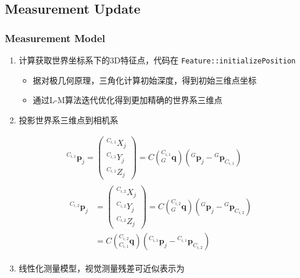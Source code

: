 \documentclass[12pt,a4paper]{article}
\begin{document}
\subsection{Measurement Update}

\subsubsection{Measurement Model}

\begin{enumerate}

\item 计算获取世界坐标系下的3D特征点，代码在 \verb|Feature::initializePosition|

\begin{itemize}
\item 据对极几何原理，三角化计算初始深度，得到初始三维点坐标
\item 通过L-M算法迭代优化得到更加精确的世界系三维点
\end{itemize}

\item 投影世界系三维点到相机系

\begin{equation*}
\begin{gathered}
{}^{C_{i, 1}}\mathbf{p}_j = 
\begin{pmatrix}
{}^{C_{i, 1}}X_j \\ {}^{C_{i, 1}}Y_j \\ {}^{C_{i, 1}}Z_j
\end{pmatrix} = 
C\left({}^{C_{i, 1}}_G\mathbf{q}\right)
\left({}^G\mathbf{p}_j-{}^G\mathbf{p}_{C_{i, 1}}\right) \\
\begin{aligned}
{}^{C_{i, 2}}\mathbf{p}_j &= 
\begin{pmatrix}
{}^{C_{i, 2}}X_j \\ {}^{C_{i, 2}}Y_j \\ {}^{C_{i, 2}}Z_j
\end{pmatrix} = 
C\left({}^{C_{i, 2}}_G\mathbf{q}\right)
\left({}^G\mathbf{p}_j-{}^G\mathbf{p}_{C_{i, 2}}\right) \\
&= C\left({}^{C_{i, 2}}_{C_{i, 1}}\mathbf{q}\right)
\left({}^{C_{i, 1}}\mathbf{p}_j - 
{}^{C_{i, 1}}\mathbf{p}_{C_{i, 2}}\right)
\end{aligned}
\end{gathered}
\end{equation*} 

\item 线性化测量模型，视觉测量残差可近似表示为


\end{enumerate}
\end{document}
